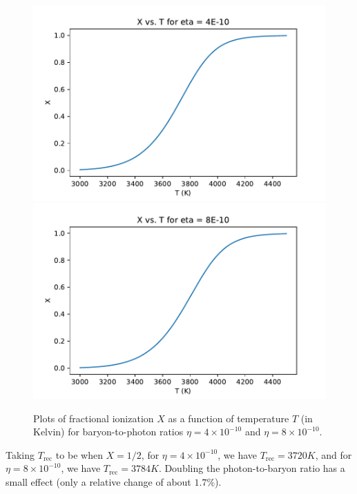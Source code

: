 \begin{figure}[htbp]
    \centering
    \includegraphics[scale=0.52]{Images/Q8-1eta4.pdf}
    \includegraphics[scale=0.52]{Images/Q8-1eta8.pdf}
    
    \caption{Plots of fractional ionization $X$ as a function of temperature $T$ (in Kelvin) for baryon-to-photon ratios $\eta = 4 \times 10^{-10}$ and $\eta = 8 \times 10^{-10}$.}
    \label{fig-Q81}
\end{figure}

Taking $T_{\text{rec}}$ to be when $X = 1/2$, for $\eta = 4 \times 10^{-10}$, we have $\boxed{T_{\text{rec}} = 3720\si{K}}$, and for $\eta = 8 \times 10^{-10}$, we have $\boxed{T_{\text{rec}} = 3784\si{K}}$. Doubling the photon-to-baryon ratio has a small effect (only a relative change of about $1.7\%$).

